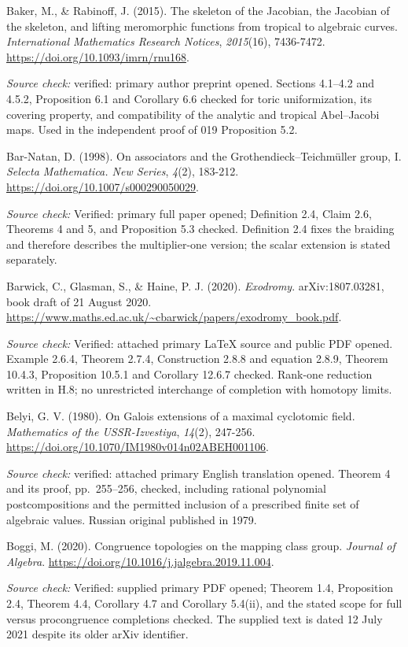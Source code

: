\documentclass[10pt,a4paper]{article}
\begin{document}
Baker, M., \& Rabinoff, J. (2015). The skeleton of the Jacobian, the Jacobian of the skeleton, and lifting meromorphic functions from tropical to algebraic curves. \emph{International Mathematics Research Notices}, \emph{2015}(16), 7436-7472. \url{https://doi.org/10.1093/imrn/rnu168}.

\emph{Source check:} verified: primary author preprint opened. Sections 4.1--4.2 and 4.5.2, Proposition 6.1 and Corollary 6.6 checked for toric uniformization, its covering property, and compatibility of the analytic and tropical Abel--Jacobi maps. Used in the independent proof of 019 Proposition 5.2.

Bar-Natan, D. (1998). On associators and the Grothendieck--Teichm\"{u}ller group, I. \emph{Selecta Mathematica. New Series}, \emph{4}(2), 183-212. \url{https://doi.org/10.1007/s000290050029}.

\emph{Source check:} Verified: primary full paper opened; Definition 2.4, Claim 2.6, Theorems 4 and 5, and Proposition 5.3 checked. Definition 2.4 fixes the braiding and therefore describes the multiplier-one version; the scalar extension is stated separately.

Barwick, C., Glasman, S., \& Haine, P. J. (2020). \emph{Exodromy}. arXiv:1807.03281, book draft of 21 August 2020. \url{https://www.maths.ed.ac.uk/~cbarwick/papers/exodromy_book.pdf}.

\emph{Source check:} Verified: attached primary LaTeX source and public PDF opened. Example 2.6.4, Theorem 2.7.4, Construction 2.8.8 and equation 2.8.9, Theorem 10.4.3, Proposition 10.5.1 and Corollary 12.6.7 checked. Rank-one reduction written in H.8; no unrestricted interchange of completion with homotopy limits.

Belyi, G. V. (1980). On Galois extensions of a maximal cyclotomic field. \emph{Mathematics of the USSR-Izvestiya}, \emph{14}(2), 247-256. \url{https://doi.org/10.1070/IM1980v014n02ABEH001106}.

\emph{Source check:} verified: attached primary English translation opened. Theorem 4 and its proof, pp.~255--256, checked, including rational polynomial postcompositions and the permitted inclusion of a prescribed finite set of algebraic values. Russian original published in 1979.

Boggi, M. (2020). Congruence topologies on the mapping class group. \emph{Journal of Algebra}. \url{https://doi.org/10.1016/j.jalgebra.2019.11.004}.

\emph{Source check:} Verified: supplied primary PDF opened; Theorem 1.4, Proposition 2.4, Theorem 4.4, Corollary 4.7 and Corollary 5.4(ii), and the stated scope for full versus procongruence completions checked. The supplied text is dated 12 July 2021 despite its older arXiv identifier.
\end{document}
